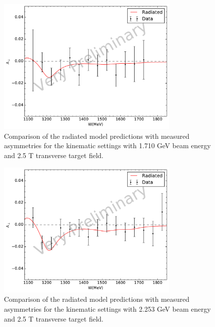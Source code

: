 \begin{figure}[p!]
  \centering
  \includegraphics[width=0.79\textwidth]{figs/asymmetry-data-model-17102590.pdf}
  \caption[Asymmetries with $E=1.710$ GeV and $B=2.5$ T.]{Comparison of the radiated model predictions with measured asymmetries for the kinematic settings with 1.710 GeV beam energy and 2.5 T transverse target field. \label{C8S2F4}}
\end{figure}

\begin{figure}[p!]
  \centering
  \includegraphics[width=0.79\textwidth]{figs/asymmetry-data-model-22532590.pdf}
  \caption[Asymmetries with $E=2.253$ GeV and $B=2.5$ T.]{Comparison of the radiated model predictions with measured asymmetries for the kinematic settings with 2.253 GeV beam energy and 2.5 T transverse target field. \label{C8S2F5}}
\end{figure}

